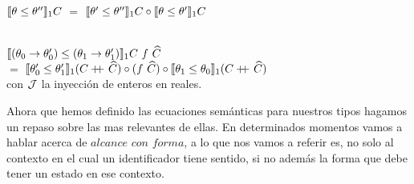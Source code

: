 \begin{definition}
\indent
$\llbracket \theta \leq \theta'' \rrbracket_1 C$ $=$ 
					$\llbracket \theta' \leq \theta'' \rrbracket_1 C \circ \llbracket \theta \leq \theta' \rrbracket_1 C$\\
\

\indent
$\semBrcks{(\theta_0 \rightarrow \theta'_0) \leq (\theta_1 \rightarrow \theta'_1)}_1 C \ f \ \widehat{C}$ \\
			\indent \indent \indent \indent \indent \indent
			$=$ 
			$\llbracket \theta'_0 \leq \theta'_1 \rrbracket_1 (C +\kern-1.3ex+\kern0.8ex \widehat{C}) 
				\circ 
			(f \ \widehat{C}) 
				\circ 
			\llbracket \theta_1 \leq \theta_0 \rrbracket_1 (C +\kern-1.3ex+\kern0.8ex \widehat{C}) 
			$\\

con $\mathcal{J}$ la inyecci\'on de enteros en reales.

\end{definition}

Ahora que hemos definido las ecuaciones sem\'anticas para nuestros tipos 
hagamos un repaso sobre las mas relevantes de ellas. En determinados momentos
vamos a hablar acerca de $\textit{alcance con forma}$, a lo que nos vamos
a referir es, no solo al contexto en el cual un identificador tiene sentido,
si no adem\'as la forma que debe tener un estado en ese contexto.

